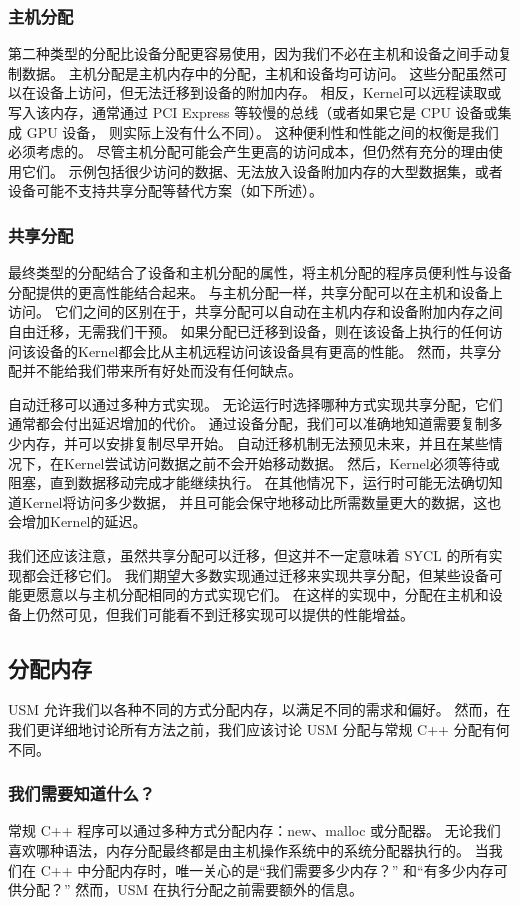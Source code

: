 \subsubsection{主机分配}
第二种类型的分配比设备分配更容易使用，因为我们不必在主机和设备之间手动复制数据。 
主机分配是主机内存中的分配，主机和设备均可访问。 这些分配虽然可以在设备上访问，但无法迁移到设备的附加内存。 
相反，Kernel可以远程读取或写入该内存，通常通过 PCI Express 等较慢的总线（或者如果它是 CPU 设备或集成 GPU 设备，
则实际上没有什么不同）。 这种便利性和性能之间的权衡是我们必须考虑的。 
尽管主机分配可能会产生更高的访问成本，但仍然有充分的理由使用它们。 
示例包括很少访问的数据、无法放入设备附加内存的大型数据集，或者设备可能不支持共享分配等替代方案（如下所述）。

\subsubsection{共享分配}
最终类型的分配结合了设备和主机分配的属性，将主机分配的程序员便利性与设备分配提供的更高性能结合起来。 
与主机分配一样，共享分配可以在主机和设备上访问。 
它们之间的区别在于，共享分配可以自动在主机内存和设备附加内存之间自由迁移，无需我们干预。 
如果分配已迁移到设备，则在该设备上执行的任何访问该设备的Kernel都会比从主机远程访问该设备具有更高的性能。 
然而，共享分配并不能给我们带来所有好处而没有任何缺点。

自动迁移可以通过多种方式实现。 无论运行时选择哪种方式实现共享分配，它们通常都会付出延迟增加的代价。 
通过设备分配，我们可以准确地知道需要复制多少内存，并可以安排复制尽早开始。 
自动迁移机制无法预见未来，并且在某些情况下，在Kernel尝试访问数据之前不会开始移动数据。 
然后，Kernel必须等待或阻塞，直到数据移动完成才能继续执行。 
在其他情况下，运行时可能无法确切知道Kernel将访问多少数据，
并且可能会保守地移动比所需数量更大的数据，这也会增加Kernel的延迟。

我们还应该注意，虽然共享分配可以迁移，但这并不一定意味着 SYCL 的所有实现都会迁移它们。 
我们期望大多数实现通过迁移来实现共享分配，但某些设备可能更愿意以与主机分配相同的方式实现它们。 
在这样的实现中，分配在主机和设备上仍然可见，但我们可能看不到迁移实现可以提供的性能增益。

\subsection{分配内存}
USM 允许我们以各种不同的方式分配内存，以满足不同的需求和偏好。 
然而，在我们更详细地讨论所有方法之前，我们应该讨论 USM 分配与常规 C++ 分配有何不同。

\subsubsection{我们需要知道什么？}
常规 C++ 程序可以通过多种方式分配内存：new、malloc 或分配器。 
无论我们喜欢哪种语法，内存分配最终都是由主机操作系统中的系统分配器执行的。 
当我们在 C++ 中分配内存时，唯一关心的是“我们需要多少内存？” 和“有多少内存可供分配？” 
然而，USM 在执行分配之前需要额外的信息。

